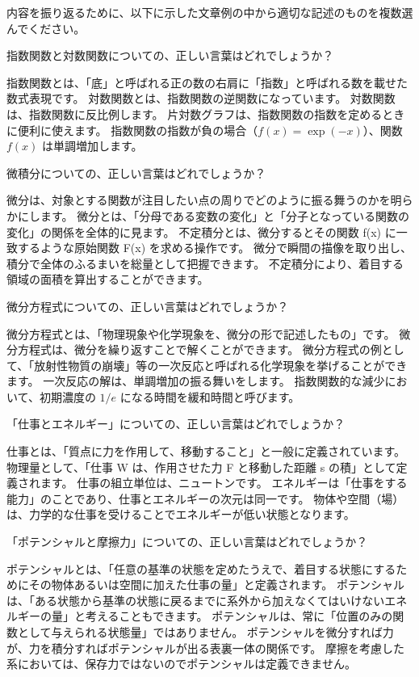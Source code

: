 \documentclass[uplatex,dvipdfmx,a4paper,11pt]{jsarticle}
\begin{document}
内容を振り返るために、以下に示した文章例の中から適切な記述のものを複数選んでください。
\begin{qlist}
	\qitem 指数関数と対数関数についての、正しい言葉はどれでしょうか？
		\begin{qlist2}
			\qitem 指数関数とは、「底」と呼ばれる正の数の右肩に「指数」と呼ばれる数を載せた数式表現です。
			\qitem 対数関数とは、指数関数の逆関数になっています。
			\qitem 対数関数は、指数関数に反比例します。
			\qitem 片対数グラフは、指数関数の指数を定めるときに便利に使えます。
			\qitem 指数関数の指数が負の場合（$f(x)=\exp(-x)$）、関数 $f(x)$ は単調増加します。
		\end{qlist2}
	\qitem 微積分についての、正しい言葉はどれでしょうか？
		\begin{qlist2}
			\qitem 微分は、対象とする関数が注目したい点の周りでどのように振る舞うのかを明らかにします。
			\qitem 微分とは、「分母である変数の変化」と「分子となっている関数の変化」の関係を全体的に見ます。
			\qitem 不定積分とは、微分するとその関数 f(x) に一致するような原始関数 F(x) を求める操作です。
			\qitem 微分で瞬間の描像を取り出し、積分で全体のふるまいを総量として把握できます。
			\qitem 不定積分により、着目する領域の面積を算出することができます。
		\end{qlist2}
	\qitem 微分方程式についての、正しい言葉はどれでしょうか？
		\begin{qlist2}
			\qitem 微分方程式とは、「物理現象や化学現象を、微分の形で記述したもの」です。
			\qitem 微分方程式は、微分を繰り返すことで解くことができます。
			\qitem 微分方程式の例として、「放射性物質の崩壊」等の一次反応と呼ばれる化学現象を挙げることができます。
			\qitem 一次反応の解は、単調増加の振る舞いをします。
			\qitem 指数関数的な減少において、初期濃度の $1/e$ になる時間を緩和時間と呼びます。
		\end{qlist2}
	\qitem 「仕事とエネルギー」についての、正しい言葉はどれでしょうか？
		\begin{qlist2}
			\qitem 仕事とは、「質点に力を作用して、移動すること」と一般に定義されています。
			\qitem 物理量として、「仕事 W は、作用させた力 F と移動した距離 s の積」として定義されます。
			\qitem 仕事の組立単位は、ニュートンです。
			\qitem エネルギーは「仕事をする能力」のことであり、仕事とエネルギーの次元は同一です。
			\qitem 物体や空間（場）は、力学的な仕事を受けることでエネルギーが低い状態となります。
		\end{qlist2}
	\qitem 「ポテンシャルと摩擦力」についての、正しい言葉はどれでしょうか？
		\begin{qlist2}
			\qitem ポテンシャルとは、「任意の基準の状態を定めたうえで、着目する状態にするためにその物体あるいは空間に加えた仕事の量」と定義されます。
			\qitem ポテンシャルは、「ある状態から基準の状態に戻るまでに系外から加えなくてはいけないエネルギーの量」と考えることもできます。
			\qitem ポテンシャルは、常に「位置のみの関数として与えられる状態量」ではありません。
			\qitem ポテンシャルを微分すれば力が、力を積分すればポテンシャルが出る表裏一体の関係です。
			\qitem 摩擦を考慮した系においては、保存力ではないのでポテンシャルは定義できません。
		\end{qlist2}
\end{qlist}
\end{document}
